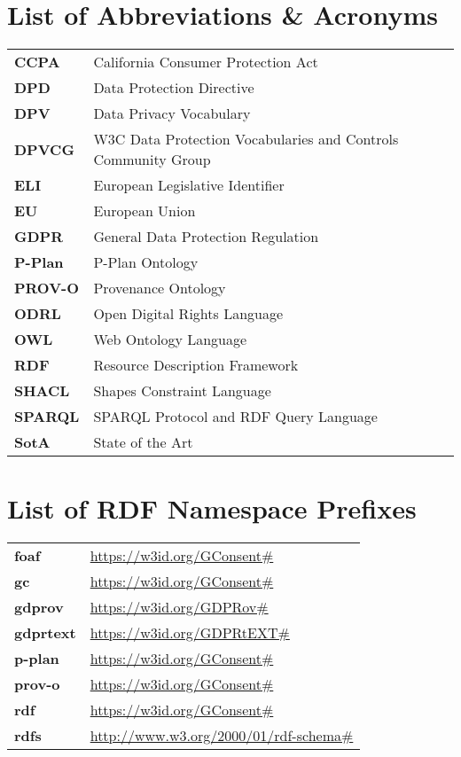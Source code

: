 \thispagestyle{empty}
\section*{List of Abbreviations \& Acronyms}
\begin{table}[htbp]
    \begin{tabular}{>{\bfseries}l|l}
        CCPA & California Consumer Protection Act \\
        DPD & Data Protection Directive \\
        DPV & Data Privacy Vocabulary \\
        DPVCG & W3C Data Protection Vocabularies and Controls Community Group \\
        ELI & European Legislative Identifier \\
        EU & European Union \\
        GDPR & General Data Protection Regulation \\
        P-Plan & P-Plan Ontology \\
        PROV-O & Provenance Ontology \\
        ODRL & Open Digital Rights Language \\ 
        OWL & Web Ontology Language \\
        RDF & Resource Description Framework \\
        SHACL & Shapes Constraint Language \\
        SPARQL & SPARQL Protocol and RDF Query Language \\
        SotA & State of the Art \\
    \end{tabular}
\end{table}

\section*{List of RDF Namespace Prefixes}
\begin{table}[htbp]
    \begin{tabular}{>{\bfseries}l|l}
        foaf      & \url{https://w3id.org/GConsent#} \\
        gc        & \url{https://w3id.org/GConsent#} \\
        gdprov    & \url{https://w3id.org/GDPRov#} \\
        gdprtext  & \url{https://w3id.org/GDPRtEXT#} \\
        p-plan    & \url{https://w3id.org/GConsent#} \\
        prov-o    & \url{https://w3id.org/GConsent#} \\
        rdf       & \url{https://w3id.org/GConsent#} \\
        rdfs      & \url{http://www.w3.org/2000/01/rdf-schema#} \\
    \end{tabular}
\end{table}
